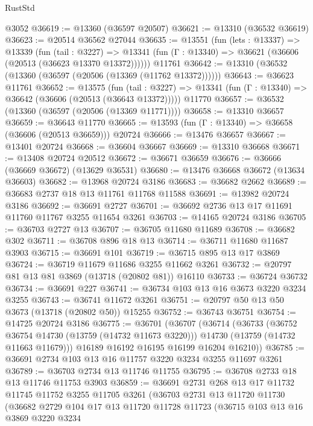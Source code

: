 \begin{lexlean}{RustStd}
\begin{coremodule}
    @3052
@36619 := @13360 (@36597 @20507)
@36621 := @13310 (@36532 @36619)
@36623 := @20514 @36562 @27044
@36635 := @13551
    (fun (lets : @13337) =>
    @13339
      (fun (tail : @3227) =>
      @13341 (fun (Γ : @13340) => @36621 (@36606 (@20513 (@36623 @13370 @13372))))))
    @11761
@36642 := @13310 (@36532 (@13360 (@36597 (@20506 (@13369 (@11762 @13372))))))
@36643 := @36623 @11761
@36652 := @13575
    (fun (tail : @3227) => @13341 (fun (Γ : @13340) => @36642 (@36606 (@20513 (@36643 @13372)))))
    @11770
@36657 := @36532 (@13360 (@36597 (@20506 (@13369 @11771))))
@36658 := @13310 @36657
@36659 := @36643 @11770
@36665 := @13593 (fun (Γ : @13340) => @36658 (@36606 (@20513 @36659))) @20724
@36666 := @13476 @36657
@36667 := @13401 @20724
@36668 := @36604 @36667
@36669 := @13310 @36668
@36671 := @13408 @20724 @20512
@36672 := @36671 @36659
@36676 := @36666 (@36669 @36672) (@13629 @36531)
@36680 := @13476 @36668 @36672 (@13634 @36603)
@36682 := @13968 @20724 @3186
@36683 := @36682 @2662
@36689 := @36683 @2737 @18 @13 @11761 @11768 @11588
@36691 := @13982 @20724 @3186
@36692 := @36691 @2727
@36701 := @36692 @2736 @13 @17 @11691 @11760 @11767 @3255 @11654 @3261
@36703 := @14165 @20724 @3186
@36705 := @36703 @2727 @13
@36707 := @36705 @11680 @11689
@36708 := @36682 @302
@36711 := @36708 @896 @18 @13
@36714 := @36711 @11680 @11687 @3903
@36715 := @36691 @101
@36719 := @36715 @895 @13 @17 @3869
@36724 := @36719 @11679 @11686 @3255 @11662 @3261
@36732 := @20797 @81 @13 @81 @3869 (@13718 (@20802 @81)) @16110
@36733 := @36724 @36732
@36734 := @36691 @227
@36741 := @36734 @103 @13 @16 @3673 @3220 @3234 @3255
@36743 := @36741 @11672 @3261
@36751 := @20797 @50 @13 @50 @3673 (@13718 (@20802 @50)) @15255
@36752 := @36743 @36751
@36754 := @14725 @20724 @3186
@36775 := @36701
    (@36707
      (@36714
        (@36733
          (@36752 @36754 @14730 (@13759 (@14732 @11673 @3220)))
          @14730
          (@13759 (@14732 @11663 @11679)))
        @16189
        @16192
        @16195
        @16199
        @16204
        @16210))
@36785 := @36691 @2734 @103 @13 @16 @11757 @3220 @3234 @3255 @11697 @3261
@36789 := @36703 @2734 @13 @11746 @11755
@36795 := @36708 @2733 @18 @13 @11746 @11753 @3903
@36859 := @36691
    @2731
    @268
    @13
    @17
    @11732
    @11745
    @11752
    @3255
    @11705
    @3261
    (@36703
      @2731
      @13
      @11720
      @11730
      (@36682
        @2729
        @104
        @17
        @13
        @11720
        @11728
        @11723
        (@36715
          @103
          @13
          @16
          @3869
          @3220
          @3234

\end{coremodule}
\end{lexlean}
